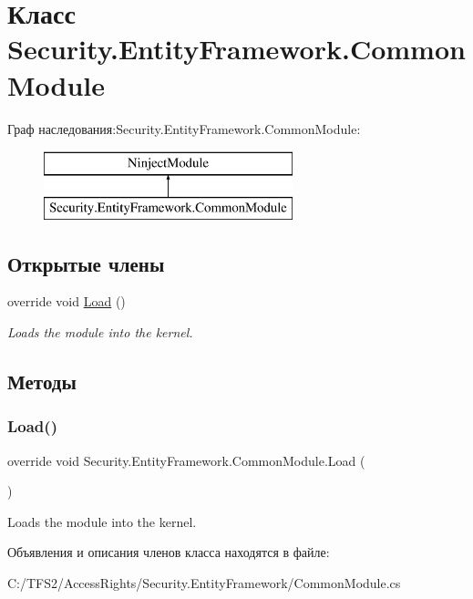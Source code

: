\hypertarget{class_security_1_1_entity_framework_1_1_common_module}{}\section{Класс Security.\+Entity\+Framework.\+Common\+Module}
\label{class_security_1_1_entity_framework_1_1_common_module}
Граф наследования\+:Security.\+Entity\+Framework.\+Common\+Module\+:\begin{figure}[H]
\begin{center}
\leavevmode
\includegraphics[height=2.000000cm]{de/d04/class_security_1_1_entity_framework_1_1_common_module}
\end{center}
\end{figure}
\subsection*{Открытые члены}
\begin{DoxyCompactItemize}
\item 
override void \hyperlink{class_security_1_1_entity_framework_1_1_common_module_ada75feb8b9cdec12647a11ad42f05bab}{Load} ()
\begin{DoxyCompactList}\small\item\em Loads the module into the kernel. \end{DoxyCompactList}\end{DoxyCompactItemize}


\subsection{Методы}
\mbox{\label{class_security_1_1_entity_framework_1_1_common_module_ada75feb8b9cdec12647a11ad42f05bab}} 
\subsubsection{\texorpdfstring{Load()}{Load()}}
{\footnotesize\ttfamily override void Security.\+Entity\+Framework.\+Common\+Module.\+Load (\begin{DoxyParamCaption}{ }\end{DoxyParamCaption})}



Loads the module into the kernel. 



Объявления и описания членов класса находятся в файле\+:\begin{DoxyCompactItemize}
\item 
C\+:/\+T\+F\+S2/\+Access\+Rights/\+Security.\+Entity\+Framework/Common\+Module.\+cs\end{DoxyCompactItemize}
